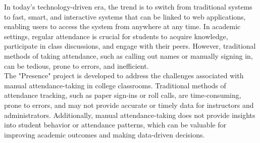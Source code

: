 In today's technology-driven era, the trend is to switch from traditional systems to fast, smart, and interactive systems that can be linked to web applications, enabling users to access the system from anywhere at any time. In academic settings, regular attendance is crucial for students to acquire knowledge, participate in class discussions, and engage with their peers. However, traditional methods of taking attendance, such as calling out names or manually signing in, can be tedious, prone to errors, and inefficient.\\

The "Presence" project is developed to address the challenges associated with manual attendance-taking in college classrooms. Traditional methods of attendance tracking, such as paper sign-ins or roll calls, are time-consuming, prone to errors, and may not provide accurate or timely data for instructors and administrators. Additionally, manual attendance-taking does not provide insights into student behavior or attendance patterns, which can be valuable for improving academic outcomes and making data-driven decisions.